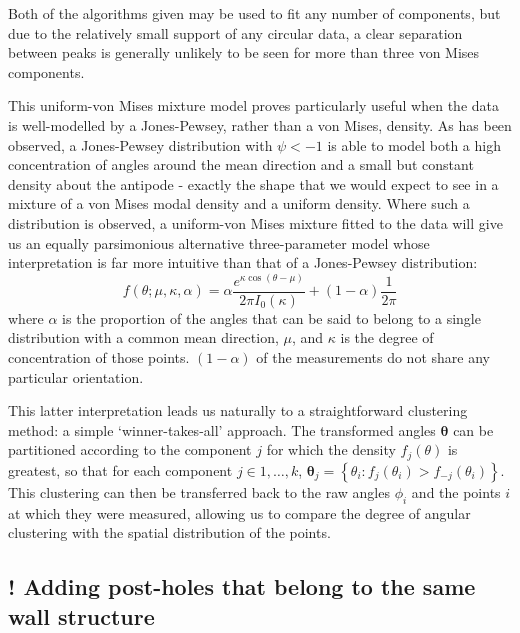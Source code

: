 \documentclass[../../ArchStats.tex]{subfiles}
\begin{document}
Both of the algorithms given may be used to fit any number of components, but due to the relatively small support of any circular data, a clear separation between peaks is generally unlikely to be seen for more than three von Mises components. 

This uniform-von Mises mixture model proves particularly useful when the data is well-modelled by a Jones-Pewsey, rather than a von Mises, density. As has been observed, a Jones-Pewsey distribution with $\psi < -1$ is able to model both  a high concentration of angles around the mean direction and a small but constant density about the antipode - exactly the shape that we would expect to see in a mixture of a von Mises modal density and a uniform density.  Where such a distribution is observed, a uniform-von Mises mixture fitted to the data will give us an equally parsimonious alternative three-parameter model whose interpretation is far more intuitive than that of a Jones-Pewsey distribution:
\begin{equation}
f(\theta; \mu, \kappa, \alpha) = \alpha \frac{e^{\kappa \cos(\theta - \mu)}}{2\pi I_0(\kappa)} + (1-\alpha)\frac{1}{2\pi}
\end{equation}
where $\alpha$ is the proportion of the angles that can be said to belong to a single distribution with a common mean direction, $\mu$, and $\kappa$ is the degree of concentration of those points. $(1-\alpha)$ of the measurements do not share any particular orientation. 

This latter interpretation leads us naturally to a straightforward clustering method: a simple `winner-takes-all' approach. The transformed angles $\boldsymbol{\theta}$ can be partitioned according to the component $j$ for which the density $f_j(\theta)$ is greatest, so that for each component $j \in 1, \dots, k$, $\boldsymbol{\theta}_j = \left\lbrace \theta_i : f_j(\theta_i) > f_{-j}(\theta_i) \right\rbrace$. This clustering can then be transferred back to the raw angles $\phi_i$ and the points $i$ at which they were measured, allowing us to compare the degree of angular clustering with the spatial distribution of the points.


\subsection{! Adding post-holes that belong to the same wall structure}

\end{document}
